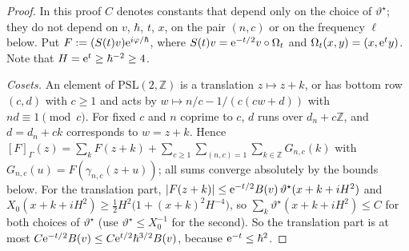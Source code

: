 \begin{proof}
In this proof $C$ denotes constants that depend only on the choice of $\vartheta^\star$; they do not depend on $v$, $\hbar$, $t$, $x$, on the pair
$(n,c)$ or on the frequency $\ell$ below. Put $F:=(S(t)v)\mathrm{e}^{i\varphi/\hbar}$, where $S(t)v=\mathrm{e}^{-t/2}v\circ \Omega_t$ and $\Omega_t(x,y)=(x,\mathrm{e}^ty)$. Note that
$H=\mathrm{e}^t\ge\hbar^{-2}\ge4$.

\emph{Cosets.} An element of $\mathrm{PSL}(2,\mathbb Z)$ is a translation $z\mapsto z+k$, or has bottom row $(c,d)$ with $c\ge1$ and acts by
$w\mapsto n/c-1/(c(cw+d))$ with $nd\equiv1\pmod c$. For fixed $c$ and $n$ coprime to $c$, $d$ runs over $d_n+c\mathbb Z$, and $d=d_n+ck$ corresponds to $w=z+k$. Hence
$[F]_\Gamma(z)=\sum_kF(z+k)+\sum_{c\ge1}\sum_{(n,c)=1}\sum_{k\in\mathbb Z}G_{n,c}(k)$ with $G_{n,c}(u)=F(\gamma_{n,c}(z+u))$; all sums converge
absolutely by the bounds below. For the translation part, $|F(z+k)|\le\mathrm{e}^{-t/2}B(v)\,\vartheta^\star(x+k+iH^2)$ and
$X_0(x+k+iH^2)\ge\tfrac12H^2\bigl(1+(x+k)^2H^{-4}\bigr)$, so $\sum_k\vartheta^\star(x+k+iH^2)\le C$ for both choices of $\vartheta^\star$ (use
$\vartheta^\star\le X_0^{-1}$ for the second). So the translation part is at most $C\mathrm{e}^{-t/2}B(v)\le C\mathrm{e}^{t/2}\hbar^{3/2}B(v)$, because $\mathrm{e}^{-t}\le\hbar^2$.


\end{proof}
